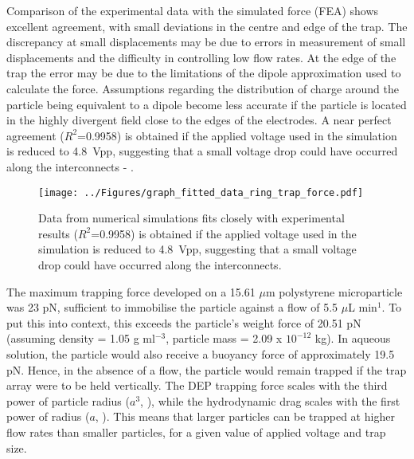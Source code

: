 Comparison of the experimental data with the simulated force (FEA) shows excellent agreement, with small deviations in the centre and edge of the trap. The discrepancy at small displacements may be due to errors in measurement of small displacements and the difficulty in controlling low flow rates.  At the edge of the trap the error may be due to the limitations of the dipole approximation used to calculate the force. Assumptions regarding the distribution of charge around the particle being equivalent to a dipole become less accurate if the particle is located in the highly divergent field close to the edges of the electrodes. A near perfect agreement ($R^{2}$=0.9958) is obtained if the applied voltage used in the simulation is reduced to 4.8~Vpp, suggesting that a small voltage drop could have occurred along the interconnects - .

\begin{figure}
	\centering
		\texttt{[image: ../Figures/graph\_fitted\_data\_ring\_trap\_force.pdf]}
	\caption[Plot of the trapping force developed by the ring traps at 4.8~Vpp.]{Data from numerical simulations fits closely with experimental results ($R^{2}$=0.9958) is obtained if the applied voltage used in the simulation is reduced to 4.8~Vpp, suggesting that a small voltage drop could have occurred along the interconnects.}
	\label{fig:graph_fitted_data_ring_trap_force}
	\end{figure}

The maximum trapping force developed on a 15.61 $\mu$m polystyrene microparticle was 23 pN, sufficient to immobilise the particle against a flow of 5.5 $\mu$L min$^{1}$. To put this into context, this exceeds the particle's weight force of 20.51 pN (assuming density = 1.05 g ml$^{-3}$, particle mass = 2.09 x $10^{-12}$ kg). In aqueous solution, the particle would also receive a buoyancy force of approximately 19.5 pN. Hence, in the absence of a flow, the particle would remain trapped if the trap array were to be held vertically. The DEP trapping force scales with the third power of particle radius ($a^{3}$, ), while the hydrodynamic drag scales with the first power of radius ($a$, ). This means that larger particles can be trapped at higher flow rates than smaller particles, for a given value of applied voltage and trap size. 

